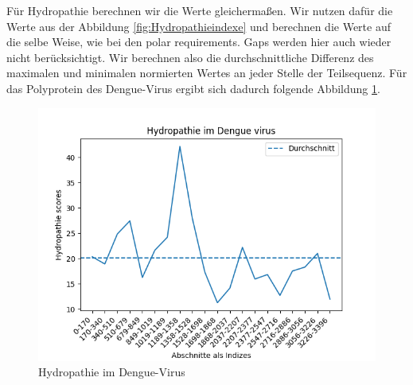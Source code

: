 \documentclass[german,version-2022-01]{uzl-thesis}
\begin{document}
F\"ur Hydropathie berechnen wir die Werte gleicherma\ss{}en. Wir nutzen daf\"ur die Werte aus der Abbildung \ref{fig:Hydropathieindexe} und berechnen die Werte auf die selbe Weise, wie bei den polar requirements. Gaps werden hier auch wieder nicht ber\"ucksichtigt. Wir berechnen also die durchschnittliche Differenz des maximalen und minimalen normierten Wertes an jeder Stelle der Teilsequenz. F\"ur das Polyprotein des Dengue-Virus ergibt sich dadurch folgende Abbildung \ref{fig:Dengue_virus_hydropathy}. 
\begin{figure}[htpb]
  \centering
  \includegraphics[scale=0.75]{Images/Diagramm_Hydropathie_im_Dengue_virus.png}
  \caption{Hydropathie im Dengue-Virus}
  \label{fig:Dengue_virus_hydropathy}
\end{figure}
\end{document}
